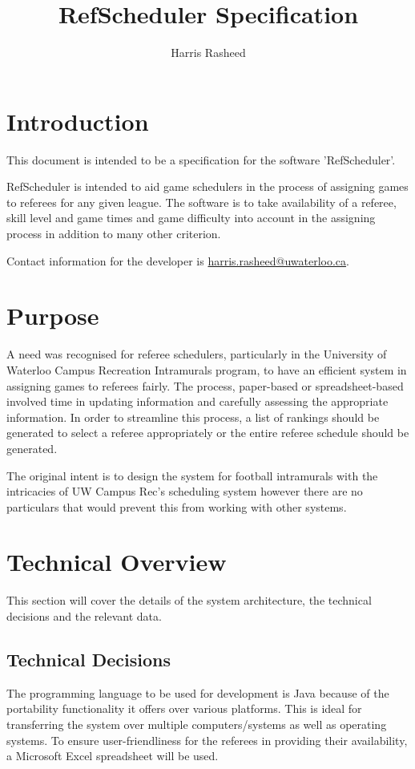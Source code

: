 \documentclass{article}
\begin{document}
\author{Harris Rasheed}
\title{RefScheduler Specification}
\maketitle

\tableofcontents
\pagebreak

\section{Introduction}
This document is intended to be a specification for the software 'RefScheduler'.

RefScheduler is intended to aid game schedulers in the process of assigning games to referees for any given league. The software is to take availability of a referee, skill level and game times and game difficulty into account in the assigning process in addition to many other criterion.

Contact information for the developer is \href{mailto:harris.rasheed@uwaterloo.ca}{harris.rasheed@uwaterloo.ca}.

\section{Purpose}
A need was recognised for referee schedulers, particularly in the University of Waterloo Campus Recreation Intramurals program, to have an efficient system in assigning games to referees fairly. The process, paper-based or spreadsheet-based involved time in updating information and carefully assessing the appropriate information. In order to streamline this process, a list of rankings should be generated to select a referee appropriately or the entire referee schedule should be generated.

The original intent is to design the system for football intramurals with the intricacies of UW Campus Rec's scheduling system however there are no particulars that would prevent this from working with other systems.

\section{Technical Overview}
This section will cover the details of the system architecture, the technical decisions and the relevant data.

\subsection{Technical Decisions}
The programming language to be used for development is Java because of the portability functionality it offers over various platforms. This is ideal for transferring the system over multiple computers/systems as well as operating systems. To ensure user-friendliness for the referees in providing their availability, a Microsoft Excel spreadsheet will be used.
\end{document}
